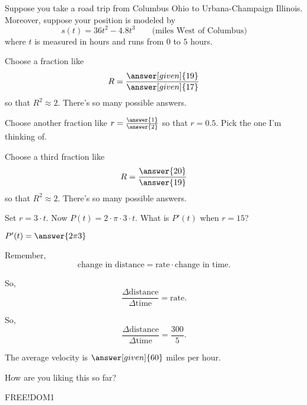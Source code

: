 \documentclass{ximera}
\begin{document}
Suppose you take a road trip from Columbus Ohio to Urbana-Champaign
Illinois. Moreover, suppose your position is modeled by
\[
s(t) = 36t^2 -4.8t^3 \qquad\text{(miles West of Columbus)} %
\]
where $t$ is measured in hours and runs from $0$ to $5$ hours. 

\begin{problem}
Choose a fraction like 
$$
R = \frac{\answer[given]{19}}{\answer[given]{17}}
$$
so that $R^2 \approx 2$.  There's so many possible answers.
\end{problem}

\begin{problem}
Choose another fraction like 
$r = \frac{\answer{1}}{\answer{2}}$
so that $r = 0.5$.  Pick the one I'm thinking of.
\end{problem}

\begin{problem}
Choose a third fraction like 
\[
R = \frac{\answer{20}}{\answer{19}}
\]
so that $R^2 \approx 2$.  There's so many possible answers.
\end{problem}

\begin{problem}\label{problem:whee}
  Set $r=3\cdot t$. Now $P(t) = 2\cdot \pi\cdot 3\cdot t$. What is
  $P'(t)$ when $r=15$?
  \begin{prompt}
    $P'(t)=\answer{2 \pi 3}$
  \end{prompt}
\end{problem}

\begin{problem}
  \label{problem:average-velocity}
  \begin{hint}
    Remember, 
    \[
    \text{change in distance} = \text{rate}\cdot\text{change in time}.
    \]
  \end{hint}
  \begin{hint}
    So, 
    \[
    \frac{\Delta\text{distance}}{\Delta\text{time}} = \text{rate}.
    \]
  \end{hint}
  \begin{hint}
    So, 
    \[
    \frac{\Delta\text{distance}}{\Delta\text{time}} = \frac{300}{5}.
    \]
  \end{hint}
  The average velocity is $\answer[given]{60}$ miles per hour.
\end{problem}

How are you liking this so far?
\begin{freeResponse}
FREE!DOM1
\end{freeResponse}
\end{document}
